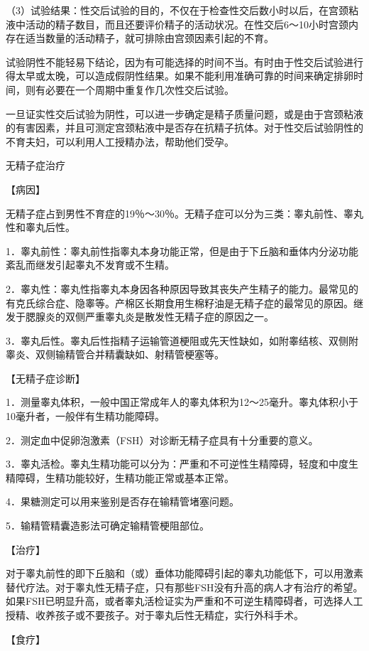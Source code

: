 \documentclass[12pt,UTF8,openany]{ctexbook}
\begin{document}
（3）试验结果：性交后试验的目的，不仅在于检查性交后数小时以后，在宫颈粘液中活动的精子数目，而且还要评价精子的活动状况。在性交后6～10小时宫颈内存在适当数量的活动精子，就可排除由宫颈因素引起的不育。

试验阴性不能轻易下结论，因为有可能选择的时间不当。有时由于性交后试验进行得太早或太晚，可以造成假阴性结果。如果不能利用准确可靠的时间来确定排卵时间，则有必要在一个周期中重复作几次性交后试验。

一旦证实性交后试验为阴性，可以进一步确定是精子质量问题，或是由于宫颈粘液的有害因素，并且可测定宫颈粘液中是否存在抗精子抗体。对于性交后试验阴性的不育夫妇，可以利用人工授精办法，帮助他们受孕。





无精子症治疗


【病因】

无精子症占到男性不育症的19％～30％。无精子症可以分为三类：睾丸前性、睾丸性和睾丸后性。

1．睾丸前性：睾丸前性指睾丸本身功能正常，但是由于下丘脑和垂体内分泌功能紊乱而继发引起睾丸不发育或不生精。

2．睾丸性：睾丸性指睾丸本身因各种原因导致其丧失产生精子的能力。最常见的有克氏综合症、隐睾等。产棉区长期食用生棉籽油是无精子症的最常见的原因。继发于腮腺炎的双侧严重睾丸炎是散发性无精子症的原因之一。

3．睾丸后性。睾丸后性指精子运输管道梗阻或先天性缺如，如附睾结核、双侧附睾炎、双侧输精管合并精囊缺如、射精管梗塞等。

【无精子症诊断】

1．测量睾丸体积，一般中国正常成年人的睾丸体积为12～25毫升。睾丸体积小于10毫升者，一般伴有生精功能障碍。

2．测定血中促卵泡激素（FSH）对诊断无精子症具有十分重要的意义。

3．睾丸活检。睾丸生精功能可以分为：严重和不可逆性生精障碍，轻度和中度生精障碍，生精功能较好，生精功能正常或基本正常。

4．果糖测定可以用来鉴别是否存在输精管堵塞问题。

5．输精管精囊造影法可确定输精管梗阻部位。

【治疗】

对于睾丸前性的即下丘脑和（或）垂体功能障碍引起的睾丸功能低下，可以用激素替代疗法。对于睾丸性无精子症，只有那些FSH没有升高的病人才有治疗的希望。如果FSH已明显升高，或者睾丸活检证实为严重和不可逆生精障碍者，可选择人工授精、收养孩子或不要孩子。对于睾丸后性无精症，实行外科手术。

【食疗】
\end{document}
